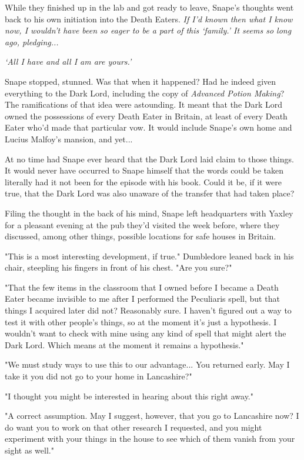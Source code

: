 While they finished up in the lab and got ready to leave, Snape's thoughts went back to his own initiation into the Death Eaters. \emph{If I'd known then what I know now, I wouldn't have been so eager to be a part of this `family.' It seems so long ago, pledging...}

\emph{`All I have and all I am are yours.'}

Snape stopped, stunned. Was that when it happened? Had he indeed given everything to the Dark Lord, including the copy of \emph{Advanced Potion Making}? The ramifications of that idea were astounding. It meant that the Dark Lord owned the possessions of every Death Eater in Britain, at least of every Death Eater who'd made that particular vow. It would include Snape's own home and Lucius Malfoy's mansion, and yet...

At no time had Snape ever heard that the Dark Lord laid claim to those things. It would never have occurred to Snape himself that the words could be taken literally had it not been for the episode with his book. Could it be, if it were true, that the Dark Lord was also unaware of the transfer that had taken place?

Filing the thought in the back of his mind, Snape left headquarters with Yaxley for a pleasant evening at the pub they'd visited the week before, where they discussed, among other things, possible locations for safe houses in Britain.

\sbreak

"This is a most interesting development, if true." Dumbledore leaned back in his chair, steepling his fingers in front of his chest. "Are you sure?"

"That the few items in the classroom that I owned before I became a Death Eater became invisible to me after I performed the Peculiaris spell, but that things I acquired later did not? Reasonably sure. I haven't figured out a way to test it with other people's things, so at the moment it's just a hypothesis. I wouldn't want to check with mine using any kind of spell that might alert the Dark Lord. Which means at the moment it remains a hypothesis."

"We must study ways to use this to our advantage... You returned early. May I take it you did not go to your home in Lancashire?"

"I thought you might be interested in hearing about this right away."

"A correct assumption. May I suggest, however, that you go to Lancashire now? I do want you to work on that other research I requested, and you might experiment with your things in the house to see which of them vanish from your sight as well."

